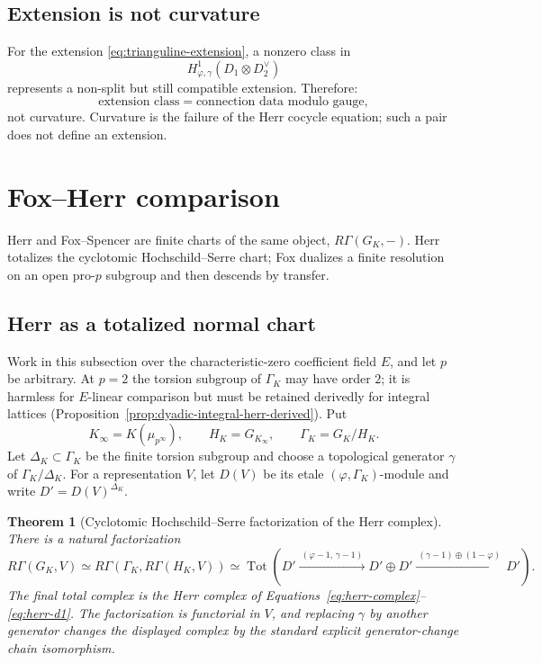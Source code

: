 \documentclass[11pt]{article}
\newtheorem{theorem}{Theorem}[section]
\theoremstyle{definition}
\newcommand{\Tot}{\operatorname{Tot}}
\begin{document}
\subsection{Extension is not curvature}

For the extension \eqref{eq:trianguline-extension}, a nonzero class in
\[
H^1_{\varphi,\gamma}(D_1\otimes D_2^\vee)
\]
represents a non-split but still compatible extension.  Therefore:
\[
\boxed{\text{extension class} = \text{connection data modulo gauge},}
\]
not curvature.  Curvature is the failure of the Herr cocycle equation; such a pair does not define an extension.

\section{Fox--Herr comparison}\label{sec:fox-herr-bridge}

Herr and Fox--Spencer are finite charts of the same object, $R\Gamma(G_K,-)$.  Herr totalizes the cyclotomic Hochschild--Serre chart; Fox dualizes a finite resolution on an open pro-$p$ subgroup and then descends by transfer.

\subsection{Herr as a totalized normal chart}

Work in this subsection over the characteristic-zero coefficient field $E$, and let $p$ be arbitrary.  At $p=2$ the torsion subgroup of $\Gamma_K$ may have order $2$; it is harmless for $E$-linear comparison but must be retained derivedly for integral lattices (Proposition~\ref{prop:dyadic-integral-herr-derived}).  Put
\[
 K_\infty=K(\mu_{p^\infty}),
 \qquad
 H_K=G_{K_\infty},
 \qquad
 \Gamma_K=G_K/H_K.
\]
Let $\Delta_K\subset\Gamma_K$ be the finite torsion subgroup and choose a topological generator $\gamma$ of $\Gamma_K/\Delta_K$.  For a representation $V$, let $D(V)$ be its etale $(\varphi,\Gamma_K)$-module and write $D'=D(V)^{\Delta_K}$.

\begin{theorem}[Cyclotomic Hochschild--Serre factorization of the Herr complex]\label{thm:herr-hochschild-serre}
There is a natural factorization
\begin{equation}\label{eq:herr-hs-factorization}
 R\Gamma(G_K,V)
 \simeq
 R\Gamma\!\left(
 \Gamma_K,
 R\Gamma(H_K,V)
 \right)
 \simeq
 \Tot\!\left(
 D'
 \xrightarrow{\ (\varphi-1,\,\gamma-1)\ }
 D'\oplus D'
 \xrightarrow{\ (\gamma-1)\oplus(1-\varphi)\ }
 D'
 \right).
\end{equation}
The final total complex is the Herr complex of Equations~\eqref{eq:herr-complex}--\eqref{eq:herr-d1}.  The factorization is functorial in $V$, and replacing $\gamma$ by another generator changes the displayed complex by the standard explicit generator-change chain isomorphism.
\end{theorem}
\end{document}
